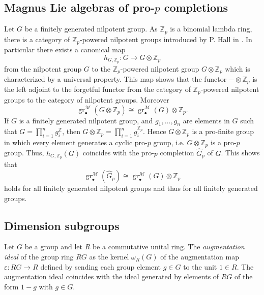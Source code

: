 \documentclass{amsart}
\theoremstyle{plain}
\theoremstyle{definition}
\numberwithin{theorem}{section}
\numberwithin{equation}{section}
\newcommand{\grM}{\operatorname{gr}^{\mathscr M}}
\newcommand{\Z}{\mathbb Z}
\begin{document}
\subsection{Magnus Lie algebras of pro-$p$ completions}
Let $G$ be a finitely generated nilpotent group.
As $\Z_p$ is a binomial lambda ring, there is a category of $\Z_p$-powered nilpotent groups introduced by P. Hall in \cite[§6]{Hall69}. 
In particular there exists a canonical map 
\begin{equation}
    h_{G, \Z_p} : G\longrightarrow G\otimes{\Z_p}
\end{equation}
from the nilpotent group $G$ to the $\Z_p$-powered nilpotent group $G \otimes {\Z_p}$ which is characterized by a universal property. 
This map shows that the   functor $-\otimes \Z_p $ is the left adjoint to the forgetful functor from the category of $\Z_p$-powered nilpotent groups to the category of nilpotent groups.
Moreover 
\begin{equation}
    \grM_\bullet(G \otimes \Z_p)\cong \grM_\bullet(G) \otimes \Z_p.
\end{equation}
\noindent
If $G$ is a finitely generated nilpotent group, and $g_1, \dots, g_n$ are elements in $G$ such that $G = \prod_{i = 1}^n g_i^\Z$, then $G \otimes \Z_p = \prod_{i = 1}^n g_i^{\Z_p}$. Hence $G \otimes \Z_p$ is a pro-finite group in which every element generates a cyclic pro-$p$ group, i.e. $G\otimes \Z_p$ is a pro-$p$ group.
Thus, $h_{G, \Z_p}(G)$ coincides with the pro-$p$ completion $\hat G_p$ of $G$. This shows that
\begin{equation}\label{eq:grM.comp}
    \grM_\bullet(\hat G_p)\cong \grM_\bullet(G)\otimes \Z_p
\end{equation}
holds for all finitely generated nilpotent groups and thus for all finitely generated groups.

\subsection{Dimension subgroups} Let $G$ be a group and let $R$ be a commutative unital ring. The \emph{augmentation ideal} of the group ring $RG$ as the kernel $\omega_R(G)$ of the augmentation map $\varepsilon : RG \to R$ defined by sending each group element $g \in G$ to the unit $1 \in R$. The augmentation ideal coincides with the ideal generated by elements of $RG$ of the form $1-g$ with $g \in G$.  
\end{document}
